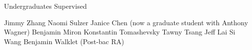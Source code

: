 \begin{rubric}{Undergraduates Supervised}

\entry* Jimmy Zhang
\entry* Naomi Sulzer
\entry* Janice Chen (now a graduate student with Anthony Wagner)
\entry* Benjamin Miron
\entry* Konstantin Tomashevsky
\entry* Tawny Tsang
\entry* Jeff Lai
\entry* Si Wang
\entry* Benjamin Walklet (Post-bac RA)

\end{rubric}
